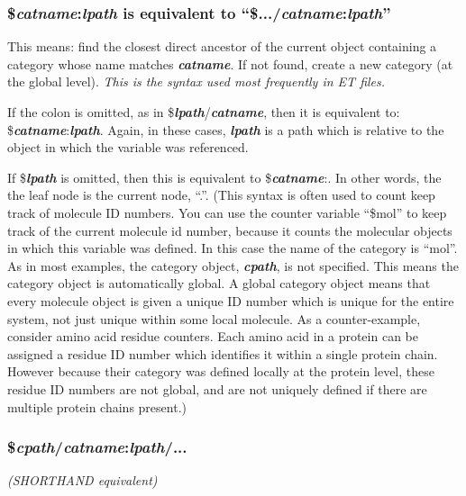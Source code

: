 \documentclass[11pt]{article}
\begin{document}
\subsubsection*{\$\textit{\textbf{catname}}:\textit{\textbf{lpath}} is equivalent to ``\$.../\textit{\textbf{catname}}:\textit{\textbf{lpath}}''}
This means: find the closest direct ancestor of the current object containing a category whose name matches \textit{\textbf{catname}}.  If not found, create a new category (at the global level).  \textit{This is the syntax used most frequently in ET files.}

If the colon is omitted, as in \$\textit{\textbf{lpath}}/\textit{\textbf{catname}}, 
then it is equivalent to: \$\textit{\textbf{catname}}:\textit{\textbf{lpath}}.
Again, in these cases, \textit{\textbf{lpath}} is a path which is relative to the object
in which the variable was referenced.

If \$\textit{\textbf{lpath}} is omitted, then this is equivalent to \$\textit{\textbf{catname}}:.  In other words, the the leaf node is the current node, ``.''.  (This syntax is often used to count keep track of molecule ID numbers.  You can use the counter variable ``\$mol'' to keep track of the current molecule id number, because it counts the molecular objects in which this variable was defined.  In this case the name of the category is ``mol''.  As in most examples, the category object, \textit{\textbf{cpath}}, is not specified.  This means the category object is automatically global.  A global category object means that every molecule object is given a unique ID number which is unique for the entire system, not just unique within some local molecule.  As a counter-example, consider amino acid residue counters.  Each amino acid in a protein can be assigned a residue ID number which identifies it within a single protein chain.   However because their category was defined locally at the protein level, these residue ID numbers are not global, and are not uniquely defined if there are multiple protein chains present.)



\subsubsection*{\$\textit{\textbf{cpath}}/\textit{\textbf{catname}}:\textit{\textbf{lpath}}/...}
\textit{(SHORTHAND equivalent)}
\end{document}
